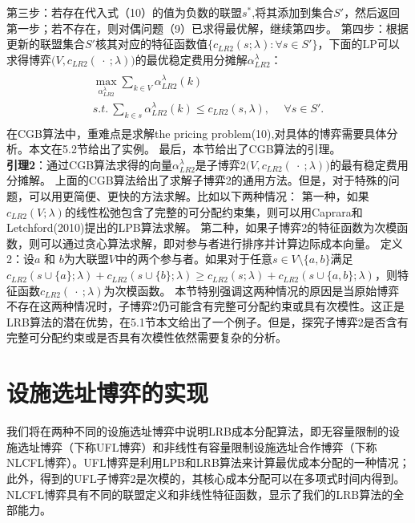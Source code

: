 \documentclass[UTF8]{article}
\begin{document}
第三步：若存在代入式（10）的值为负数的联盟$s^*$,将其添加到集合$S'$，然后返回第一步；若不存在，则对偶问题（9）已求得最优解，继续第四步。
第四步：根据更新的联盟集合$S'$核其对应的特征函数值$\{c_{LR2}(s;\lambda):\forall s \in S' \}$，下面的LP可以求得博弈$\big(V, c_{LR2}(\ \cdot\ ;\lambda)\big)$的最优稳定费用分摊解$\alpha_{LR2}^{\lambda}$：
\begin{eqnarray*}\label{eqn:alpha2}
\begin{aligned}
\begin{split}
\max_{\alpha_{LR2}^{\lambda}} \sum_{k \in  V} \alpha_{LR2}^{\lambda}(k)~~&\\
s.t.~\sum_{k \in s} \alpha_{LR2}^{\lambda}(k) \leq  c_{LR2}(s,\lambda),&~~\forall s \in S'.
\end{split}
\end{aligned}
\end{eqnarray*}
在CGB算法中，重难点是求解the pricing problem(10),对具体的博弈需要具体分析。本文在5.2节给出了实例。
最后，本节给出了CGB算法的引理。\\
\textbf{引理2}：通过CGB算法求得的向量$\alpha_{LR2}^{\lambda}$是子博弈2$\big(V,c_{LR2}(\ \cdot\ ;\lambda)\big)$的最有稳定费用分摊解。
上面的CGB算法给出了求解子博弈2的通用方法。但是，对于特殊的问题，可以用更简便、更快的方法求解。比如以下两种情况：
第一种，如果$c_{LR2}(V;\lambda)$的线性松弛包含了完整的可分配约束集，则可以用Caprara和Letchford(2010)提出的LPB算法求解。
第二种，如果子博弈2的特征函数为次模函数，则可以通过贪心算法求解，即对参与者进行排序并计算边际成本向量。
定义2：设$a$ 和 $b$为大联盟$V$中的两个参与者。如果对于任意$s \in V \setminus \{a,b\}$满足$c_{LR2}(s \cup \{a\};\lambda) + c_{LR2}(s \cup \{b\};\lambda) \geq c_{LR2}(s;\lambda) + c_{LR2}(s \cup \{a,b\};\lambda)$，则特征函数$c_{LR2}(\ \cdot\ ;\lambda)$为次模函数。
本节特别强调这两种情况的原因是当原始博弈不存在这两种情况时，子博弈2仍可能含有完整可分配约束或具有次模性。这正是LRB算法的潜在优势，在5.1节本文给出了一个例子。但是，探究子博弈2是否含有完整可分配约束或是否具有次模性依然需要复杂的分析。



\section{设施选址博弈的实现}
我们将在两种不同的设施选址博弈中说明LRB成本分配算法，即无容量限制的设施选址博弈（下称UFL博弈）和非线性有容量限制设施选址合作博弈（下称NLCFL博弈）。UFL博弈是利用LPB和LRB算法来计算最优成本分配的一种情况；此外，得到的UFL子博弈2是次模的，其核心成本分配可以在多项式时间内得到。NLCFL博弈具有不同的联盟定义和非线性特征函数，显示了我们的LRB算法的全部能力。
\end{document}
